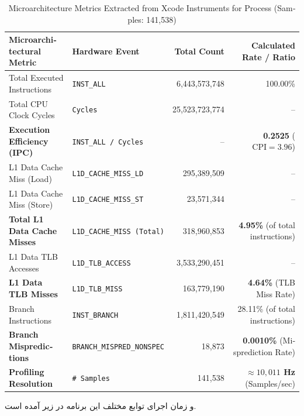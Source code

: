 \documentclass{article}
\begin{document}
\begin{latin}
	\begin{table}[htbp]
		\centering
		\caption{Microarchitecture Metrics Extracted from Xcode Instruments for Process (Samples: 141,538)}
		\label{tab:microarchitecture_metrics_full}
		\begin{tabular}{llrr}
			\toprule
			\textbf{Microarchitectural Metric} & \textbf{Hardware Event} & \textbf{Total Count} & \textbf{Calculated Rate / Ratio} \\
			\midrule
			Total Executed Instructions & \texttt{INST\_ALL} & 6,443,573,748 & 100.00\% \\
			Total CPU Clock Cycles & \texttt{Cycles} & 25,523,723,774 & -- \\
			\textbf{Execution Efficiency (IPC)} & \texttt{INST\_ALL / Cycles} & -- & \textbf{0.2525} ($\text{CPI} = 3.96$) \\
			\midrule
			L1 Data Cache Miss (Load) & \texttt{L1D\_CACHE\_MISS\_LD} & 295,389,509 & -- \\
			L1 Data Cache Miss (Store) & \texttt{L1D\_CACHE\_MISS\_ST} & 23,571,344 & -- \\
			\textbf{Total L1 Data Cache Misses} & \texttt{L1D\_CACHE\_MISS (Total)} & 318,960,853 & \textbf{4.95\%} (of total instructions) \\
			\midrule
			L1 Data TLB Accesses & \texttt{L1D\_TLB\_ACCESS} & 3,533,290,451 & -- \\
			\textbf{L1 Data TLB Misses} & \texttt{L1D\_TLB\_MISS} & 163,779,190 & \textbf{4.64\%} (TLB Miss Rate) \\
			\midrule
			Branch Instructions & \texttt{INST\_BRANCH} & 1,811,420,549 & 28.11\% (of total instructions) \\
			\textbf{Branch Mispredictions} & \texttt{BRANCH\_MISPRED\_NONSPEC} & 18,873 & \textbf{0.0010\%} (Misprediction Rate) \\
			\midrule
			\textbf{Profiling Resolution} & \texttt{\# Samples} & 141,538 & \textbf{$\approx 10,011$ Hz} (Samples/sec) \\
			\bottomrule
		\end{tabular}
	\end{table}
\end{latin}


و زمان اجرای توابع مختلف این برنامه در زیر آمده است.
\end{document}
